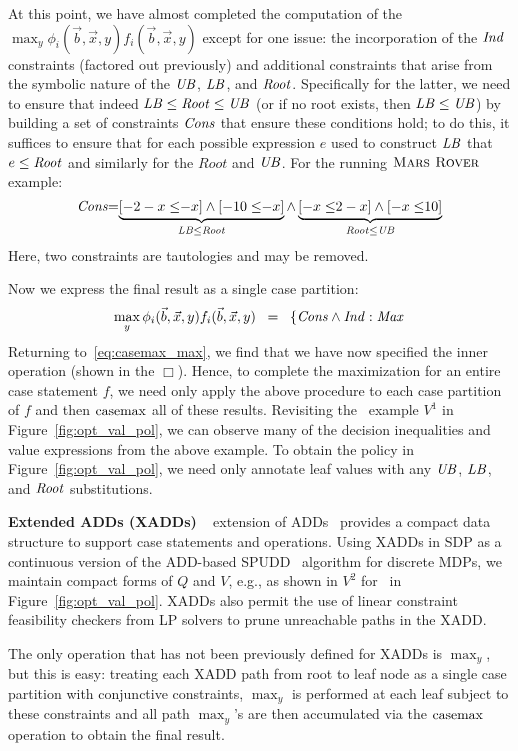 At this point, we have almost completed the computation
of the $\max_y \phi_i(\vec{b},\vec{x},y) f_i(\vec{b},\vec{x},y)$
except for one issue: the incorporation of the $\mathit{Ind}$ constraints
(factored out previously) and additional constraints that arise from the
symbolic nature of the $\mathit{UB}$, $\mathit{LB}$, and $\mathit{Root}$.  Specifically
for the latter, we need to ensure that indeed $\mathit{LB} \leq \mathit{Root} \leq \mathit{UB}$
(or if no root exists, then $\mathit{LB} \leq \mathit{UB}$) by building a set
of constraints $\mathit{Cons}$ that ensure these conditions hold; to do this,
it suffices to ensure that for each possible expression $e$ used to
construct $\mathit{LB}$ that $e \leq \mathit{Root}$ and similarly for the $Root$ and $\mathit{UB}$.
For the running $\textsc{Mars Rover}$ example:
{\footnotesize 
\begin{equation*}
\mathit{Cons} \hspace{-1mm} = \hspace{-1mm} \underbrace{[-2 - x \leq \hspace{-1mm} -x] \land [-10 \leq \hspace{-1mm} -x]}_{\mathit{LB} \leq \mathit{Root}} \land \underbrace{[-x \leq \hspace{-1mm} 2 - x] \land [-x \leq \hspace{-1mm} 10]}_{\mathit{Root} \leq \mathit{UB}} 
\end{equation*}}
Here, two constraints are tautologies and may be removed.

Now we express the final result as a single case partition:
\begin{equation*}
\max_y \phi_i(\vec{b},\vec{x},y) f_i(\vec{b},\vec{x},y) \;\; = \;\;
\left\{ \mathit{Cons} \land \mathit{Ind}: \mathit{Max} \right.
\end{equation*}
Returning to~\eqref{eq:casemax_max}, we find that we have
now specified the inner operation (shown in the $\Box$).  
Hence, to complete the
maximization for an entire case statement $f$, we need only apply the
above procedure to each case partition of $f$ and then $\mathrm{casemax}$ all
of these results.  Revisiting the \MarsRover\ example $V^1$ in
Figure~\ref{fig:opt_val_pol}, we can observe many of the decision 
inequalities and value expressions from the above example.  To obtain
the policy in Figure~\ref{fig:opt_val_pol}, 
we need only annotate leaf values with any 
$\mathit{UB}$, $\mathit{LB}$, and $\mathit{Root}$ substitutions.


{\bf Extended ADDs (XADDs)}
%
%
~\cite{sanner_uai11} extension of
ADDs~\cite{bahar93add} provides a compact data structure to support
case statements and operations.  Using XADDs in SDP as a continuous
version of the ADD-based SPUDD~\cite{spudd} algorithm for
discrete MDPs, we maintain compact forms of $Q$ and $V$, e.g., as
shown in $V^2$ for \MarsRover\ in Figure~\ref{fig:opt_val_pol}.  XADDs
also permit the use of linear constraint feasibility checkers 
from LP solvers to prune unreachable paths in the XADD.

The only operation that has not been previously defined for XADDs is
$\max_y$, but this is easy: treating each XADD path from root to
leaf node as a single case partition with conjunctive constraints, 
$\max_y$ is performed at each leaf subject to these constraints
and all path $\max_y$'s are then accumulated via the $\mathrm{casemax}$
operation to obtain the final result.

